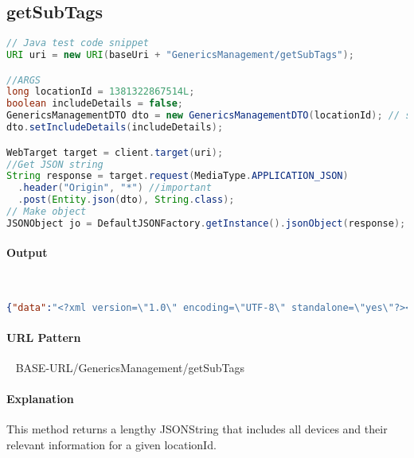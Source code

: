 \documentclass[
10pt, %
letterpaper, %
oneside, %
headinclude,footinclude, %
BCOR5mm, %
]{scrartcl}
\begin{document}

\subsection{\textbf{getSubTags}}

\begin{lstlisting}[language=Java]
// Java test code snippet
URI uri = new URI(baseUri + "GenericsManagement/getSubTags");

//ARGS
long locationId = 1381322867514L; 
boolean includeDetails = false;
GenericsManagementDTO dto = new GenericsManagementDTO(locationId); // searching for location 202
dto.setIncludeDetails(includeDetails);

WebTarget target = client.target(uri);
//Get JSON string
String response = target.request(MediaType.APPLICATION_JSON)
  .header("Origin", "*") //important
  .post(Entity.json(dto), String.class);
// Make object
JSONObject jo = DefaultJSONFactory.getInstance().jsonObject(response);
\end{lstlisting}

\paragraph{Output}~
\begin{lstlisting}[language=json]
{"data":"<?xml version=\"1.0\" encoding=\"UTF-8\" standalone=\"yes\"?><deviceTag id=\"1381322867351\" displayId=\"1381322867514\" name=\"device_tags\" locationId=\"24\"><deviceTag id=\"1381322867355\" name=\"Electrical\" locationId=\"24\"><deviceTag id=\"1381322867356\" name=\"Panel A\" locationId=\"24\"><deviceTag id=\"1381322867358\" name=\"10 Furnace\" locationId=\"24\"/><deviceTag id=\"1381322867359\" name=\"11 Lights - Server Room, Store Room\" locationId=\"24\"/>.....}
\end{lstlisting}

\paragraph{URL Pattern} 
~\newline
BASE-URL/GenericsManagement/getSubTags

\paragraph{Explanation} This method returns a lengthy JSONString that includes all devices and their relevant information for a given locationId.
\end{document}
